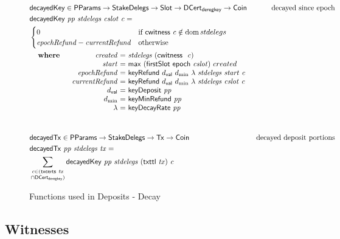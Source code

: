 \begin{figure}[htb]
  \begin{align*}
      & \fun{decayedKey} \in
      \PParams \to \StakeDelegs \to \Slot \to \DCertDeRegKey \to \Coin
      & \text{decayed since epoch} \\
      & \decayedKey{pp}{stdelegs}{cslot}{c} =\\
      & \begin{cases}
            0 & \text{if}~\cwitness c \notin \dom stdelegs\\
            \var{epochRefund} - \var{currentRefund}
            & \text{otherwise}
        \end{cases}\\
      &
      \begin{array}{lr@{~=~}l}
        \where
          & \var{created} & \var{stdelegs}~(\cwitness~\var{c}) \\
          & \var{start} & \mathsf{max}~(\firstSlot{\epoch{cslot}})~created \\
          & \var{epochRefund} & \keyRefund{\dval}{d_{\min}}{\lambda}{stdelegs}{start}{c} \\
          & \var{currentRefund} & \keyRefund{\dval}{d_{\min}}{\lambda}{stdelegs}{cslot}{c} \\
          & \dval & \fun{keyDeposit}~\var{pp}\\
          & d_{\min} & \fun{keyMinRefund}~\var{pp}\\
          & \lambda & \fun{keyDecayRate}~\var{pp}\\
      \end{array}\\
      \nextdef
      & \fun{decayedTx} \in \PParams \to \StakeDelegs \to \Tx \to \Coin
      & \text{decayed deposit portions} \\
      & \decayedTx{pp}{stdelegs}{tx} =\\
      &   \sum\limits_{\substack{c \in (\txcerts{tx} \\ \cap \DCertDeRegKey)}}
          \decayedKey{pp}{stdelegs}{(\txttl{tx})}{c}\\
  \end{align*}
  \caption{Functions used in Deposits - Decay}
  \label{fig:functions:deposits-decay}
\end{figure}

\clearpage

\subsection{Witnesses}
\label{sec:witnesses-shelley}

